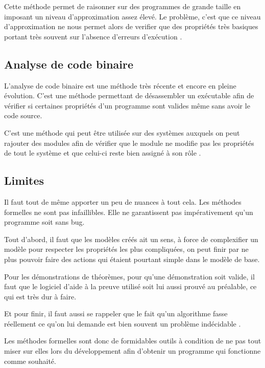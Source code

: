 \documentclass[12pt]{report}
\begin{document}
Cette méthode permet de raisonner sur des programmes de grande taille en imposant un niveau d'approximation assez élevé. Le problème, c'est que ce niveau d'approximation ne nous permet alors de verifier que des propriétés très basiques portant très souvent sur l'absence d'erreurs d'exécution \cite{cousot}.    
\subsection{Analyse de code binaire}

L'analyse de code binaire est une méthode très récente et encore en pleine évolution. C'est une méthode permettant de désassembler un exécutable afin de vérifier si certaines propriétés d'un programme sont valides même sans avoir le code source. 

C'est une méthode qui peut être utilisée sur des systèmes auxquels on peut rajouter des modules afin de vérifier que le module ne modifie pas les propriétés de tout le système et que celui-ci reste bien assigné à son rôle \cite{griffault}.
\subsection{Limites}

Il faut tout de même apporter un peu de nuances à tout cela. Les méthodes formelles ne sont pas infaillibles. Elle ne garantissent pas impérativement qu'un programme soit sans bug.

Tout d'abord, il faut que les modèles créés ait un sens, à force de complexifier un modèle pour respecter les propriétés les plus compliquées, on peut finir par ne plus pouvoir faire des actions qui étaient pourtant simple dans le modèle de base. 

Pour les démonstrations de théorèmes, pour qu'une démonstration soit valide, il faut que le logiciel d'aide à la preuve utilisé soit lui aussi prouvé au préalable, ce qui est très dur à faire.

Et pour finir, il faut aussi se rappeler que le fait qu'un algorithme fasse réellement ce qu'on lui demande est bien souvent un problème indécidable \cite{griffault}.

Les méthodes formelles sont donc de formidables outils à condition de ne pas tout miser sur elles lors du développement afin d'obtenir un programme qui fonctionne comme souhaité.

\printglossaries
\printbibliography
\end{document}
